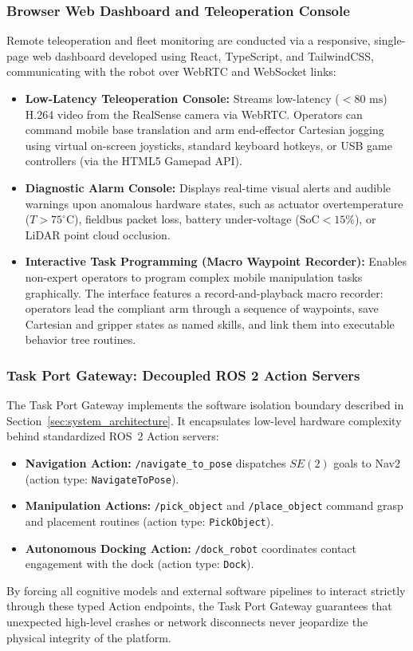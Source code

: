 \subsubsection{Browser Web Dashboard and Teleoperation Console}
Remote teleoperation and fleet monitoring are conducted via a responsive, single-page web dashboard developed using React, TypeScript, and TailwindCSS, communicating with the robot over WebRTC and WebSocket links:
\begin{itemize}[leftmargin=1.5em]
  \item \textbf{Low-Latency Teleoperation Console:} Streams low-latency ($<80\text{ ms}$) H.264 video from the RealSense camera via WebRTC. Operators can command mobile base translation and arm end-effector Cartesian jogging using virtual on-screen joysticks, standard keyboard hotkeys, or USB game controllers (via the HTML5 Gamepad API).
  \item \textbf{Diagnostic Alarm Console:} Displays real-time visual alerts and audible warnings upon anomalous hardware states, such as actuator overtemperature ($T > 75^\circ\text{C}$), fieldbus packet loss, battery under-voltage ($\text{SoC} < 15\%$), or LiDAR point cloud occlusion.
  \item \textbf{Interactive Task Programming (Macro Waypoint Recorder):} Enables non-expert operators to program complex mobile manipulation tasks graphically. The interface features a record-and-playback macro recorder: operators lead the compliant arm through a sequence of waypoints, save Cartesian and gripper states as named skills, and link them into executable behavior tree routines.
\end{itemize}

\subsubsection{Task Port Gateway: Decoupled ROS 2 Action Servers}
The Task Port Gateway implements the software isolation boundary described in Section~\ref{sec:system_architecture}. It encapsulates low-level hardware complexity behind standardized ROS~2 Action servers:
\begin{itemize}[leftmargin=1.5em]
  \item \textbf{Navigation Action:} \texttt{/navigate\_to\_pose} dispatches $SE(2)$ goals to Nav2 (action type: \texttt{NavigateToPose}).
  \item \textbf{Manipulation Actions:} \texttt{/pick\_object} and \texttt{/place\_object} command grasp and placement routines (action type: \texttt{PickObject}).
  \item \textbf{Autonomous Docking Action:} \texttt{/dock\_robot} coordinates contact engagement with the dock (action type: \texttt{Dock}).
\end{itemize}
By forcing all cognitive models and external software pipelines to interact strictly through these typed Action endpoints, the Task Port Gateway guarantees that unexpected high-level crashes or network disconnects never jeopardize the physical integrity of the platform.
